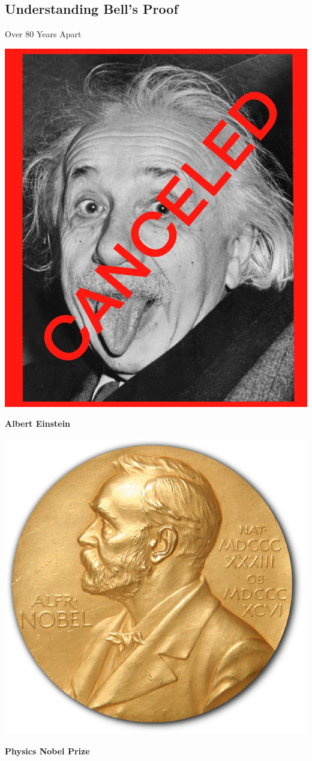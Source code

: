\subsection{Understanding Bell's Proof}
\begin{frame}{Over 80 Years Apart}
  \begin{minipage}{0.48\textwidth}
    \centering
    \includegraphics[width=0.8\linewidth]{figures/einstein.jpeg}
    \par\vspace{0.2cm}
    \textbf{Albert Einstein}
  \end{minipage}
  \hfill
  \begin{minipage}{0.48\textwidth}
    \centering
    \includegraphics[width=0.8\linewidth]{figures/nobel.png}
    \par\vspace{0.2cm}
    \textbf{Physics Nobel Prize}
  \end{minipage}
\end{frame}


